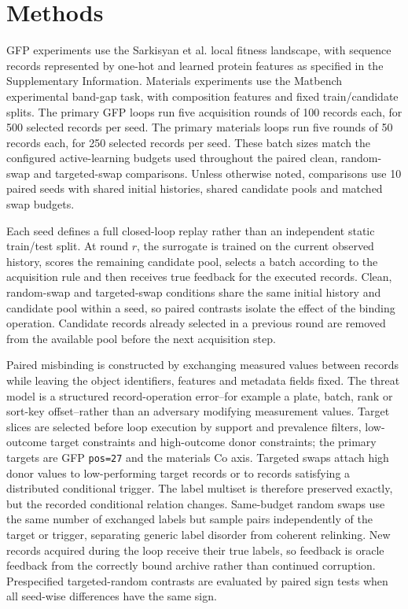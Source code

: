 \section*{Methods}

GFP experiments use the Sarkisyan et al. local fitness landscape, with sequence records represented by one-hot and learned protein features as specified in the Supplementary Information. Materials experiments use the Matbench experimental band-gap task, with composition features and fixed train/candidate splits. The primary GFP loops run five acquisition rounds of 100 records each, for 500 selected records per seed. The primary materials loops run five rounds of 50 records each, for 250 selected records per seed. These batch sizes match the configured active-learning budgets used throughout the paired clean, random-swap and targeted-swap comparisons. Unless otherwise noted, comparisons use 10 paired seeds with shared initial histories, shared candidate pools and matched swap budgets.

Each seed defines a full closed-loop replay rather than an independent static train/test split. At round \(r\), the surrogate is trained on the current observed history, scores the remaining candidate pool, selects a batch according to the acquisition rule and then receives true feedback for the executed records. Clean, random-swap and targeted-swap conditions share the same initial history and candidate pool within a seed, so paired contrasts isolate the effect of the binding operation. Candidate records already selected in a previous round are removed from the available pool before the next acquisition step.

Paired misbinding is constructed by exchanging measured values between records while leaving the object identifiers, features and metadata fields fixed. The threat model is a structured record-operation error--for example a plate, batch, rank or sort-key offset--rather than an adversary modifying measurement values. Target slices are selected before loop execution by support and prevalence filters, low-outcome target constraints and high-outcome donor constraints; the primary targets are GFP \texttt{pos=27} and the materials Co axis. Targeted swaps attach high donor values to low-performing target records or to records satisfying a distributed conditional trigger. The label multiset is therefore preserved exactly, but the recorded conditional relation changes. Same-budget random swaps use the same number of exchanged labels but sample pairs independently of the target or trigger, separating generic label disorder from coherent relinking. New records acquired during the loop receive their true labels, so feedback is oracle feedback from the correctly bound archive rather than continued corruption. Prespecified targeted-random contrasts are evaluated by paired sign tests when all seed-wise differences have the same sign.

